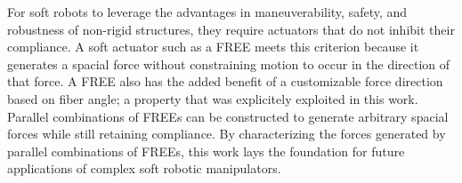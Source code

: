 For soft robots to leverage the advantages in maneuverability, safety, and robustness of non-rigid structures, they require actuators that do not inhibit their compliance. 
A soft actuator such as a FREE meets this criterion because it generates a spacial force without constraining motion to occur in the direction of that force. 
A FREE also has the added benefit of a customizable force direction based on fiber angle; a property that was explicitely exploited in this work.
Parallel combinations of FREEs can be constructed to generate arbitrary spacial forces while still retaining compliance. 
By characterizing the forces generated by parallel combinations of FREEs, this work lays the foundation for future applications of complex soft robotic manipulators.
